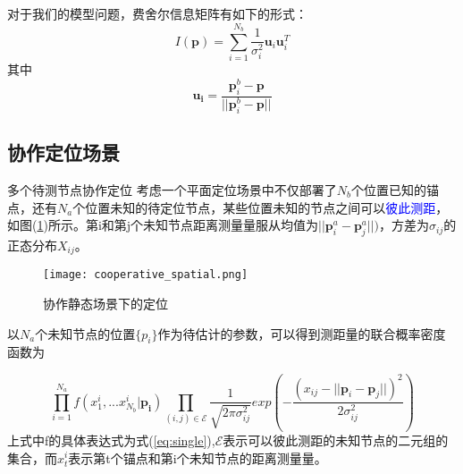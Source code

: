 对于我们的模型问题，费舍尔信息矩阵有如下的形式：
\begin{equation}\label{eq:uu}
I(\bm{p})=\displaystyle\sum_{i=1}^{N_b}\frac{1}{\sigma_i^2}\bm{u}_i\bm{u}_i^T
\end{equation}
其中
\begin{equation}
\bm{u_i}=\frac{\bm{p}^b_i-\bm{p}}{||\bm{p}^b_i-\bm{p}||}
\end{equation}


\subsection[协作定位场景]{协作定位场景}

{多个待测节点协作定位}
考虑一个平面定位场景中不仅部署了$N_b$个位置已知的锚点，还有$N_a$个位置未知的待定位节点，某些位置未知的节点之间可以\textcolor{blue}{彼此测距}，如图(\ref{fig:cooperative_spatial})所示。第i和第j个未知节点距离测量量服从均值为$||\bm{p}^a_i-\bm{p}^a_j||)$，方差为$\sigma_{ij}$的正态分布$X_{ij}$。
        \begin{figure}
          \centering
          \texttt{[image: cooperative\_spatial.png]}
          \caption{协作静态场景下的定位}\label{fig:cooperative_spatial}
        \end{figure}

以$N_a$个未知节点的位置$\{p_i\}$作为待估计的参数，可以得到测距量的联合概率密度函数为

\begin{equation}
\prod_{i=1}^{N_a} f(x^i_1,...x^{i}_{N_b}|\bm{p_i})\prod_{(i,j)\in \mathcal{E}}\frac{1}{\sqrt{2\pi\sigma_{ij}^2}}exp(-\frac{(x_{ij}-||\bm{p}_i-\bm{p}_j||)^2}{2\sigma_{ij}^2})
\end{equation}
上式中f的具体表达式为式(\ref{eq:single}),$\mathcal{E}$表示可以彼此测距的未知节点的二元组的集合，而$x_t^i$表示第t个锚点和第i个未知节点的距离测量量。

